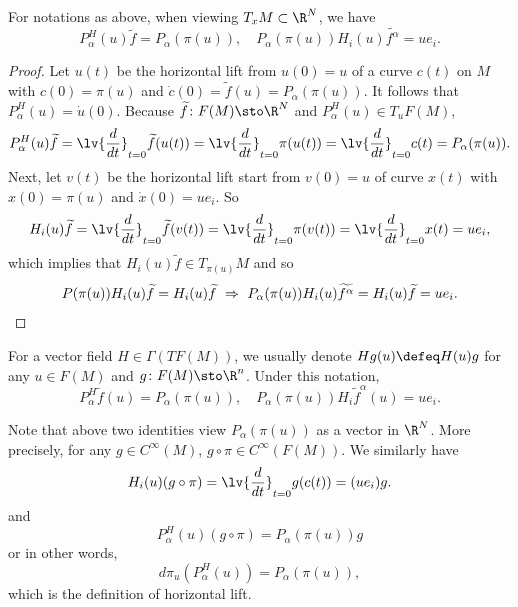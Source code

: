 \begin{lem}
    For notations as above, when viewing $T_xM \subset \R^N$, we have
    \begin{equation*}
        P^H_\alpha(u)\widetilde{f}=P_\alpha(\pi(u)),\quad P_\alpha(\pi(u))H_i(u)\widetilde{f^\alpha} = ue_i.
    \end{equation*}
\end{lem}
\begin{proof}
    Let $u(t)$ be the horizontal lift from $u(0) = u$ of a curve $c(t)$ on $M$ with $c(0) = \pi(u)$ and $\dot{c}(0) = \widetilde{f}(u) = P_\alpha(\pi(u))$. It follows that $P^H_\alpha(u) = \dot{u}(0)$. Because $\widetilde{f} \colon F(M) \sto \R^N$ and $P^H_\alpha(u) \in T_uF(M)$,
    \begin{equation*}
        P^H_\alpha(u)\widetilde{f} = \lv{\frac{d}{dt}}_{t = 0} \widetilde{f}(u(t)) =  \lv{\frac{d}{dt}}_{t = 0} \pi(u(t)) =  \lv{\frac{d}{dt}}_{t = 0} c(t) = P_\alpha(\pi(u)).
    \end{equation*}
    Next, let $v(t)$ be the horizontal lift start from $v(0) = u$ of curve $x(t)$ with $x(0) = \pi(u)$ and $\dot{x}(0) = ue_i$. So
    \begin{equation*}
        H_i(u) \widetilde{f} = \lv{\frac{d}{dt}}_{t = 0} \widetilde{f}(v(t)) = \lv{\frac{d}{dt}}_{t = 0} \pi(v(t)) = \lv{\frac{d}{dt}}_{t = 0} x(t) = ue_i,
    \end{equation*}
    which implies that $H_i(u) \widetilde{f} \in T_{\pi(u)}M$ and so
    \begin{equation*}
        P(\pi(u)) H_i(u) \widetilde{f} = H_i(u) \widetilde{f}~\Rightarrow~P_\alpha(\pi(u))H_i(u)\widetilde{f^\alpha} = H_i(u) \widetilde{f} = ue_i. \qedhere
    \end{equation*}
\end{proof}
\begin{rmk}
    For a vector field $H \in \Gamma(TF(M))$, we usually denote $Hg(u) \defeq H(u)g$ for any $u \in F(M)$ and $g \colon F(M) \sto \R^n$. Under this notation,
    \begin{equation*}
        P_\alpha^H \widetilde{f}(u)=P_\alpha(\pi(u)),\quad P_\alpha(\pi(u)) H_i \widetilde{f}^\alpha(u)=u e_i.
    \end{equation*}
\end{rmk}
\begin{rmk}
    Note that above two identities view $P_\alpha(\pi(u))$ as a vector in $\R^N$. More precisely, for any $g \in C^\infty(M)$, $g \circ \pi \in C^\infty(F(M))$. We similarly have
    \begin{equation*}
        H_i(u)(g \circ \pi) = \lv{\frac{d}{dt}}_{t = 0}g(c(t)) = (ue_i)g.
    \end{equation*}
    and
    \begin{equation*}
        P_\alpha^H(u) (g \circ \pi) = P_\alpha(\pi(u))g
    \end{equation*}
    or in other words,
    \begin{equation*}
        d\pi_u (P_\alpha^H(u)) = P_\alpha(\pi(u)),
    \end{equation*}
    which is the definition of horizontal lift.
\end{rmk}

